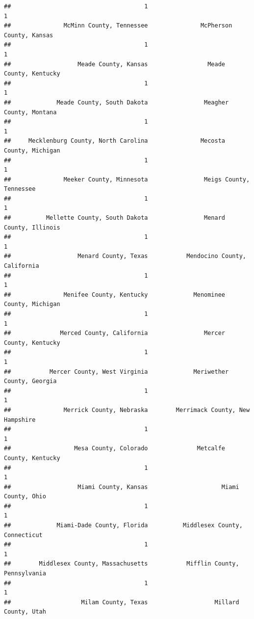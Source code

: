 \documentclass[
]{article}
\begin{document}
\begin{verbatim}
##                                      1                                      1 
##               McMinn County, Tennessee               McPherson County, Kansas 
##                                      1                                      1 
##                   Meade County, Kansas                 Meade County, Kentucky 
##                                      1                                      1 
##             Meade County, South Dakota                Meagher County, Montana 
##                                      1                                      1 
##     Mecklenburg County, North Carolina               Mecosta County, Michigan 
##                                      1                                      1 
##               Meeker County, Minnesota                Meigs County, Tennessee 
##                                      1                                      1 
##          Mellette County, South Dakota                Menard County, Illinois 
##                                      1                                      1 
##                   Menard County, Texas           Mendocino County, California 
##                                      1                                      1 
##               Menifee County, Kentucky             Menominee County, Michigan 
##                                      1                                      1 
##              Merced County, California                Mercer County, Kentucky 
##                                      1                                      1 
##           Mercer County, West Virginia             Meriwether County, Georgia 
##                                      1                                      1 
##               Merrick County, Nebraska        Merrimack County, New Hampshire 
##                                      1                                      1 
##                  Mesa County, Colorado              Metcalfe County, Kentucky 
##                                      1                                      1 
##                   Miami County, Kansas                     Miami County, Ohio 
##                                      1                                      1 
##             Miami-Dade County, Florida          Middlesex County, Connecticut 
##                                      1                                      1 
##        Middlesex County, Massachusetts           Mifflin County, Pennsylvania 
##                                      1                                      1 
##                    Milam County, Texas                   Millard County, Utah 

\end{verbatim}
\end{document}
